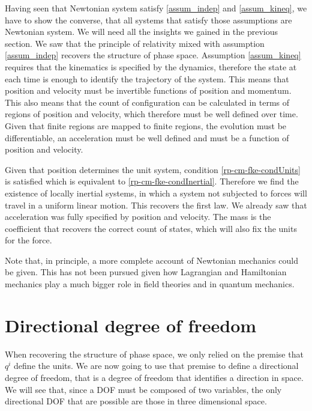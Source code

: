 Having seen that Newtonian system satisfy \ref{assum_indep} and \ref{assum_kineq}, we have to show the converse, that all systems that satisfy those assumptions are Newtonian system. We will need all the insights we gained in the previous section. We saw that the principle of relativity mixed with assumption \ref{assum_indep} recovers the structure of phase space. Assumption \ref{assum_kineq} requires that the kinematics is specified by the dynamics, therefore the state at each time is enough to identify the trajectory of the system. This means that position and velocity must be invertible functions of position and momentum. This also means that the count of configuration can be calculated in terms of regions of position and velocity, which therefore must be well defined over time. Given that finite regions are mapped to finite regions, the evolution must be differentiable, an acceleration must be well defined and must be a function of position and velocity.

Given that position determines the unit system, condition \ref{rp-cm-fke-condUnits} is satisfied which is equivalent to \ref{rp-cm-fke-condInertial}. Therefore we find the existence of locally inertial systems, in which a system not subjected to forces will travel in a uniform linear motion. This recovers the first law. We already saw that acceleration was fully specified by position and velocity. The mass is the coefficient that recovers the correct count of states, which will also fix the units for the force.

Note that, in principle, a more complete account of Newtonian mechanics could be given. This has not been pursued given how Lagrangian and Hamiltonian mechanics play a much bigger role in field theories and in quantum mechanics. 


\section{Directional degree of freedom}

When recovering the structure of phase space, we only relied on the premise that $q^i$ define the units. We are now going to use that premise to define a directional degree of freedom, that is a degree of freedom that identifies a direction in space. We will see that, since a DOF must be composed of two variables, the only directional DOF that are possible are those in three dimensional space.

